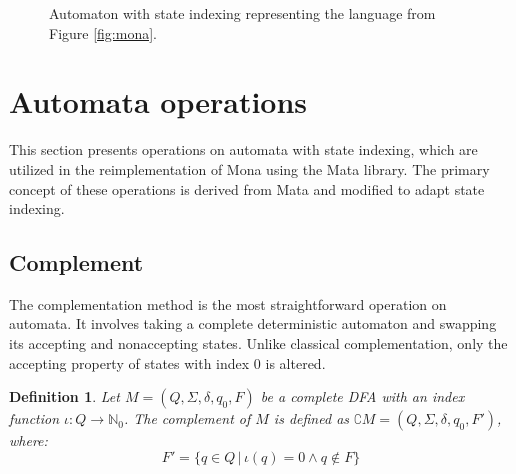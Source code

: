 \documentclass[pdflatex,sn-mathphys-num]{sn-jnl}%
\theoremstyle{thmstyleone}%
\theoremstyle{thmstyletwo}%
\theoremstyle{thmstylethree}%
\newtheorem{definition}{Definition}%
\begin{document}
        \begin{figure}[h]
            \centering
            \caption{Automaton with state indexing representing the language from Figure \ref{fig:mona}.}
        \end{figure}

\section{Automata operations}
    This section presents operations on automata with state indexing, which are utilized in the reimplementation of Mona using the Mata library. The primary concept of these operations is derived from Mata and modified to adapt state indexing.

    \subsection{Complement}
        The complementation method is the most straightforward operation on automata. It involves taking a complete deterministic automaton and swapping its accepting and nonaccepting states. Unlike classical complementation, only the accepting property of states with index $0$ is altered.

        \vspace*{0.5em}

        \begin{definition}
            Let $M = (Q, \Sigma, \delta, q_0, F)$ be a complete DFA with an index function $\iota : Q \rightarrow \mathbb{N}_0$. The complement of $M$ is defined as $\complement M = (Q, \Sigma, \delta, q_0, F')$, where:
            $$
            F' = \{q \in Q\,|\, \iota(q) = 0 \land q \notin F\}
            $$
        \end{definition}
\end{document}
